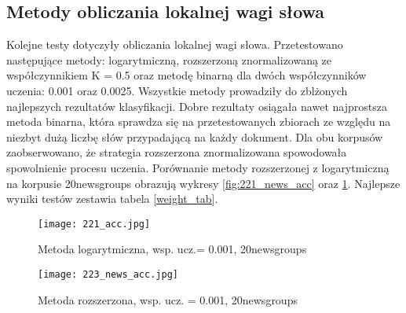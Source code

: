 \documentclass{pracamgr}
\begin{document}
\begin{table}[]
\centering
{}
\caption{Zależność między współczynnikiem doboru wag zerowych a najlepszą wartością miary F1 klasyfikatora - Reuters}
\label{zero_w_reut}
\end{table}

\subsection{Metody obliczania lokalnej wagi słowa}

Kolejne testy dotyczyły obliczania lokalnej wagi słowa. Przetestowano następujące metody: logarytmiczną, rozszerzoną znormalizowaną ze współczynnikiem K = 0.5 oraz metodę binarną dla dwóch współczynników uczenia: 0.001 oraz 0.0025. Wszystkie metody prowadziły do zblżonych najlepszych rezultatów klasyfikacji. Dobre rezultaty osiągała nawet najprostsza metoda binarna, która sprawdza się na przetestowanych zbiorach ze względu na niezbyt dużą liczbę słów przypadającą na każdy dokument. Dla obu korpusów zaobserwowano, że strategia rozszerzona znormalizowana spowodowała spowolnienie procesu uczenia. Porównanie metody rozszerzonej z logarytmiczną na korpusie 20newsgroups obrazują wykresy \ref{fig:221_news_acc} oraz \ref{fig:223_news_acc}. Najlepsze wyniki testów zestawia tabela \ref{weight_tab}.

\begin{figure}[]
  \texttt{[image: 221\_acc.jpg]}
  \caption{Metoda logarytmiczna, wsp. ucz.= 0.001, 20newsgroups}\label{fig:221_news_acc}
\endminipage\hfill
{}%
  \texttt{[image: 223\_news\_acc.jpg]}
  \caption{Metoda rozszerzona, wsp. ucz. = 0.001, 20newsgroups}\label{fig:223_news_acc}
\endminipage\hfill
\end{figure}
\end{document}
